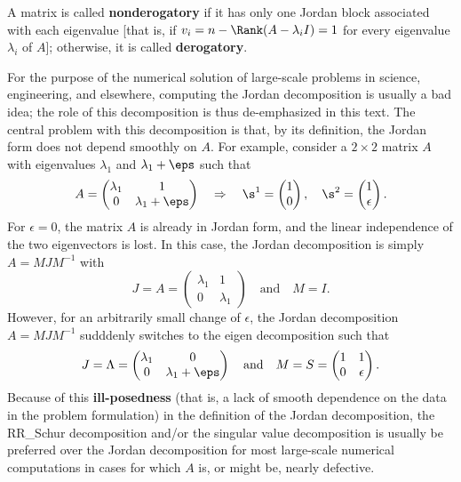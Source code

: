 A matrix is called {\bf nonderogatory} if it has only one Jordan block associated with each eigenvalue [that is, if $v_i=n-\Rank(A-\lambda_i I)=1$ for every eigenvalue $\lambda_i$ of $A$];
otherwise, it is called {\bf derogatory}.

For the purpose of the numerical solution of large-scale problems in
science, engineering, and elsewhere, computing the
Jordan decomposition is usually a bad idea; the role of this
decomposition is thus de-emphasized in this text.  The central problem with
this decomposition is that, by its definition, the Jordan form does
not depend smoothly on $A$.  For example, consider a $2\times 2$
matrix $A$ with eigenvalues $\lambda_{1}$ and $\lambda_{1}+\eps$ such
that
\begin{equation}
    A=\begin{pmatrix}
     \lambda_{1} & 1 \\ 0 & \lambda_{1}+\eps
    \end{pmatrix} \quad \Rightarrow \quad
    \s^{1}=\begin{pmatrix} 1 \\ 0 \end{pmatrix}, \quad \s^{2}=\begin{pmatrix} 1 \\ \epsilon \end{pmatrix}.
    \label{A1example}
\end{equation}
For $\epsilon=0$, the matrix $A$ is already in Jordan form, and the
linear independence of the two eigenvectors is lost.  In this case,
the Jordan decomposition is simply $A=MJM^{-1}$ with
\begin{equation*}
    J=A=\begin{pmatrix}
	 \lambda_{1} & 1 \\ 0 & \lambda_{1}
	\end{pmatrix}\quad \textrm{and} \quad M=I.
\end{equation*}
However, for an arbitrarily small change of $\epsilon$, the Jordan
decomposition $A=MJM^{-1}$ sudddenly switches to the eigen decomposition such that
\begin{equation*}
	J=\Lambda=\begin{pmatrix} \lambda_{1} & 0 \\ 0 & \lambda_{1}+\eps
	\end{pmatrix} \quad \textrm{and} \quad M=S =\begin{pmatrix} 1 &
	1 \\ 0 & \epsilon \end{pmatrix}.
\end{equation*}
Because of this {\bf ill-posedness} (that is, a lack of smooth
dependence on the data in the problem formulation) in the definition
of the Jordan decomposition, the RR_Schur decomposition and/or the
singular value decomposition is usually be preferred over the Jordan
decomposition for most large-scale numerical computations in cases for which $A$ is, or
might be, nearly defective.

